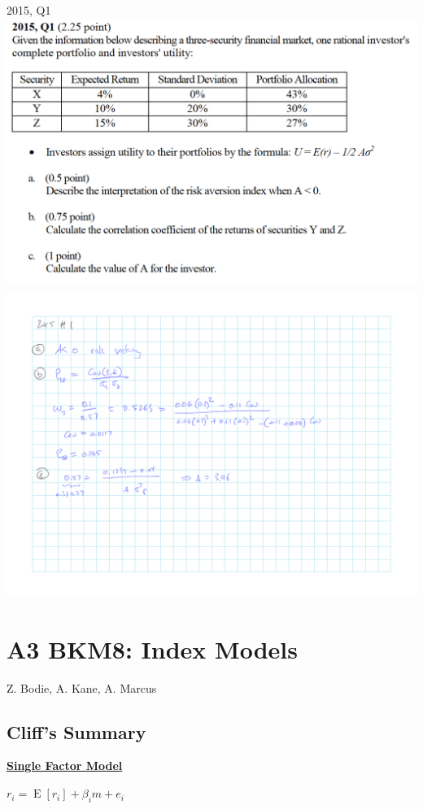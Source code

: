 \documentclass[]{book}
\theoremstyle{definition}
\theoremstyle{definition}
\theoremstyle{remark}
\begin{document}
 2015, Q1 \includegraphics{questions/2015-1Q.png}
\includegraphics{questions/2015-1A.png}

\chapter{A3 BKM8: Index Models}\label{a3-bkm8-index-models}

Z. Bodie, A. Kane, A. Marcus

\section{Cliff's Summary}\label{cliffs-summary-2}

\protect\hyperlink{single-factor}{\textbf{Single Factor Model}}

\(r_i = \operatorname{E}[r_i] + \beta_i m + e_i\)
\end{document}
